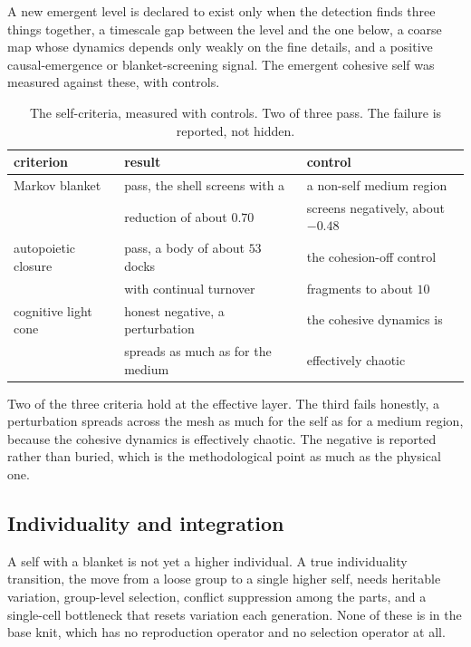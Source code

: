 A new emergent level is declared to exist only when the detection finds three things together, a timescale gap between the level and the one below, a coarse map whose dynamics depends only weakly on the fine details, and a positive causal-emergence or blanket-screening signal. The emergent cohesive self was measured against these, with controls.

\begin{table}[ht]
\centering
\begin{tabular}{@{}lll@{}}
\toprule
criterion & result & control \\
\midrule
Markov blanket & pass, the shell screens with a & a non-self medium region \\
 & reduction of about $0.70$ & screens negatively, about $-0.48$ \\
autopoietic closure & pass, a body of about $53$ docks & the cohesion-off control \\
 & with continual turnover & fragments to about $10$ \\
cognitive light cone & honest negative, a perturbation & the cohesive dynamics is \\
 & spreads as much as for the medium & effectively chaotic \\
\bottomrule
\end{tabular}
\caption{The self-criteria, measured with controls. Two of three pass. The failure is reported, not hidden.}
\label{tab:self-criteria}
\end{table}

Two of the three criteria hold at the effective layer. The third fails honestly, a perturbation spreads across the mesh as much for the self as for a medium region, because the cohesive dynamics is effectively chaotic. The negative is reported rather than buried, which is the methodological point as much as the physical one.

\subsection{Individuality and integration}

A self with a blanket is not yet a higher individual. A true individuality transition, the move from a loose group to a single higher self, needs heritable variation, group-level selection, conflict suppression among the parts, and a single-cell bottleneck that resets variation each generation. None of these is in the base knit, which has no reproduction operator and no selection operator at all.

